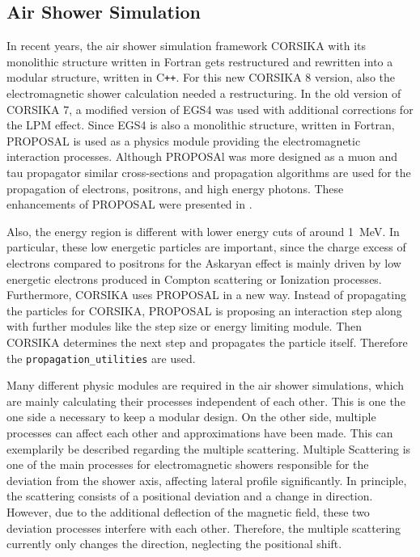 %

\subsection{Air Shower Simulation} \label{sec:corsika}

In recent years, the air shower simulation framework CORSIKA \cite{CORSIKA, Engel19} with its monolithic structure written in Fortran gets restructured and rewritten into a modular structure, written in C\texttt{++}.
For this new CORSIKA 8 version, also the electromagnetic shower calculation needed a restructuring.
In the old version of CORSIKA 7, a modified version of EGS4 \cite{Bielajew94EGS4, Nelson94EGS4, EGS5} was used with additional corrections for the LPM effect.
Since EGS4 is also a monolithic structure, written in Fortran, PROPOSAL is used as a physics module providing the electromagnetic interaction processes.
Although PROPOSAl was more designed as a muon and tau propagator similar cross-sections and propagation algorithms are used for the propagation of electrons, positrons, and high energy photons.
These enhancements of PROPOSAL were presented in \cite{Alameddine20PROPOSAL}.

Also, the energy region is different with lower energy cuts of around \SI{1}{MeV}.
In particular, these low energetic particles are important, since the charge excess of electrons compared to positrons for the Askaryan effect is mainly driven by low energetic electrons produced in Compton scattering or Ionization processes.
Furthermore, CORSIKA uses PROPOSAL in a new way.
Instead of propagating the particles for CORSIKA, PROPOSAL is proposing an interaction step along with further modules like the step size or energy limiting module.
Then CORSIKA determines the next step and propagates the particle itself.
Therefore the \texttt{propagation\_utilities} are used.

Many different physic modules are required in the air shower simulations, which are mainly calculating their processes independent of each other.
This is one the one side a necessary to keep a modular design.
On the other side, multiple processes can affect each other and approximations have been made.
This can exemplarily be described regarding the multiple scattering.
Multiple Scattering is one of the main processes for electromagnetic showers responsible for the deviation from the shower axis, affecting lateral profile significantly.
In principle, the scattering consists of a positional deviation and a change in direction.
However, due to the additional deflection of the magnetic field, these two deviation processes interfere with each other.
Therefore, the multiple scattering currently only changes the direction, neglecting the positional shift.

